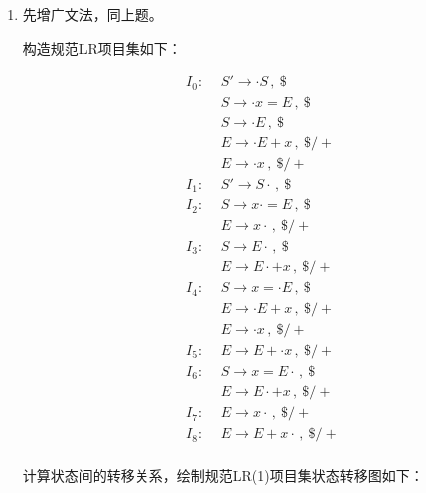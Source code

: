 \documentclass[UTF8]{report}
\begin{document}
\begin{enumerate}[label=(\arabic*)]
    \item 先增广文法，同上题。
    
    构造规范LR项目集如下：

    \begin{align*}
        I_0: \,\ &S' \to \cdot S \,,\ \$ \\
        &S \to \cdot x = E \,,\ \$ \\
        &S \to \cdot E \,,\ \$ \\
        &E \to \cdot E + x \,,\ \$ \slash + \\
        &E \to \cdot x \,,\ \$ \slash + \\
        I_1: \,\ &S' \to S \cdot \,,\ \$ \\
        I_2: \,\ &S \to x \cdot = E \,,\ \$ \\
        &E \to x \cdot \,,\ \$ \slash + \\
        I_3: \,\ &S \to E \cdot \,,\ \$ \\
        &E \to E \cdot + x \,,\ \$ \slash + \\
        I_4: \,\ &S \to x = \cdot E \,,\ \$ \\
        &E \to \cdot E + x \,,\ \$ \slash + \\
        &E \to \cdot x \,,\ \$ \slash + \\
        I_5: \,\ &E \to E + \cdot x \,,\ \$ \slash + \\
        I_6: \,\ &S \to x = E \cdot \,,\ \$ \\
        &E \to E \cdot + x \,,\ \$ \slash + \\
        I_7: \,\ &E \to x \cdot \,,\ \$ \slash + \\
        I_8: \,\ &E \to E + x \cdot \,,\ \$ \slash + \\
    \end{align*}

    计算状态间的转移关系，绘制规范LR(1)项目集状态转移图如下：
    
    \begin{figure}[H]
        \centering
\end{figure}
\end{enumerate}
\end{document}
